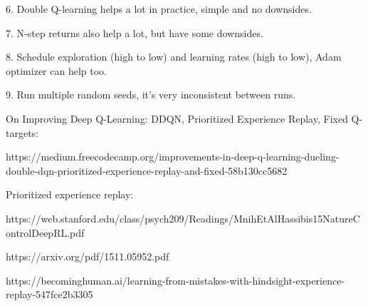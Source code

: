 \documentclass{article}
\begin{document}
6. Double Q-learning helps a lot in practice, simple and no downsides.

7. N-step returns also help a lot, but have some downsides.

8. Schedule exploration (high to low) and learning rates (high to low),  Adam optimizer can help too.

9. Run multiple random seeds, it’s very inconsistent between runs.




























\small


On Improving Deep Q-Learning: DDQN, Prioritized Experience Replay, Fixed Q-targets:

https://medium.freecodecamp.org/improvements-in-deep-q-learning-dueling-double-dqn-prioritized-experience-replay-and-fixed-58b130cc5682


Prioritized experience replay: 

https://web.stanford.edu/class/psych209/Readings/MnihEtAlHassibis15NatureControlDeepRL.pdf 

https://arxiv.org/pdf/1511.05952.pdf 

https://becominghuman.ai/learning-from-mistakes-with-hindsight-experience-replay-547fce2b3305
\end{document}
